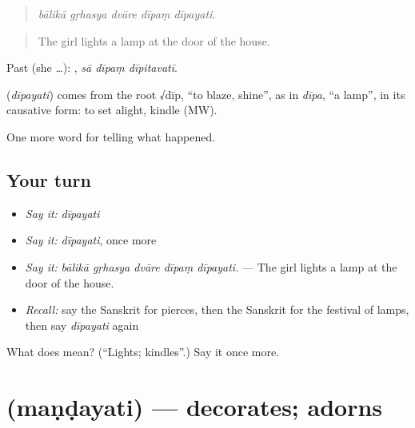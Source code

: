\begin{quote}
    
\end{quote}

\begin{quote}
\emph{bālikā gṛhasya dvāre dīpaṃ dīpayati.}
\end{quote}

\begin{quote}
The girl lights a lamp at the door of the house.
\end{quote}

Past (she …):   , \emph{sā dīpaṃ dīpitavatī}.

\begin{cousinweb}
\textbf{} (\emph{dīpayati}) comes from the root √dīp, \textquotedblleft{}to blaze, shine\textquotedblright{}, as in \emph{dīpa}, \textquotedblleft{}a lamp\textquotedblright{}, in its causative form: to set alight, kindle (MW).
\end{cousinweb}

\begin{grammarlens}[title={What you've built}]
One more word for telling what happened.
\end{grammarlens}

\subsection*{Your turn}
\begin{itemize}
\raggedright
  \item \emph{Say it:} \emph{dīpayati}
  \item \emph{Say it:} \emph{dīpayati}, once more
  \item \emph{Say it:} \emph{bālikā gṛhasya dvāre dīpaṃ dīpayati.} — The girl lights a lamp at the door of the house.
  \item \emph{Recall:} say the Sanskrit for pierces, then the Sanskrit for the festival of lamps, then say \emph{dīpayati} again
\end{itemize}

\begin{tcolorbox}[breakable,colback=teal!4,colframe=teal!35!black,title={Before you move on}]
What does  mean? (\textquotedblleft{}Lights; kindles\textquotedblright{}.) Say it once more.
\end{tcolorbox}
\section[\texorpdfstring{\sk{मण्डयति} (maṇḍayati)}{मण्डयति (maṇḍayati)}]{ (maṇḍayati) — decorates; adorns}

